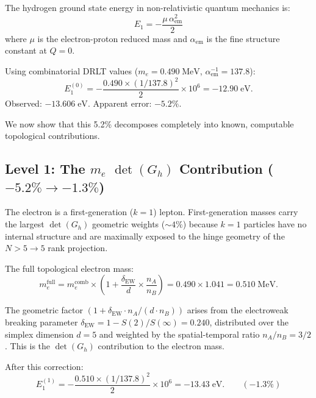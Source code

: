 \documentclass[12pt]{article}
\theoremstyle{remark}
\theoremstyle{definition}
\begin{document}
The hydrogen ground state energy in non-relativistic quantum mechanics is:
\begin{equation}
E_1 = -\frac{\mu\,\alpha_\text{em}^2}{2}
\end{equation}
where $\mu$ is the electron-proton reduced mass and $\alpha_\text{em}$ is the fine structure constant at $Q = 0$.

Using combinatorial DRLT values ($m_e = 0.490\;\text{MeV}$, $\alpha_\text{em}^{-1} = 137.8$):
\begin{equation}
E_1^{(0)} = -\frac{0.490 \times (1/137.8)^2}{2} \times 10^6 = -12.90\;\text{eV}.
\end{equation}
Observed: $-13.606\;\text{eV}$. Apparent error: $-5.2\%$.

We now show that this 5.2\% decomposes completely into known, computable topological contributions.

\subsection{Level 1: The $m_e$ $\det(G_h)$ Contribution ($-5.2\% \to -1.3\%$)}

The electron is a first-generation ($k = 1$) lepton. First-generation masses carry the largest $\det(G_h)$ geometric weights ($\sim 4\%$) because $k = 1$ particles have no internal structure and are maximally exposed to the hinge geometry of the $N > 5 \to 5$ rank projection.

The full topological electron mass:
\begin{equation}
m_e^\text{full} = m_e^\text{comb} \times \left(1 + \frac{\delta_\text{EW}}{d} \times \frac{n_A}{n_B}\right) = 0.490 \times 1.041 = 0.510\;\text{MeV}.
\end{equation}

The geometric factor $(1 + \delta_\text{EW} \cdot n_A/(d \cdot n_B))$ arises from the electroweak breaking parameter $\delta_\text{EW} = 1 - S(2)/S(\infty) = 0.240$, distributed over the simplex dimension $d = 5$ and weighted by the spatial-temporal ratio $n_A/n_B = 3/2$. This is the $\det(G_h)$ contribution to the electron mass.

After this correction:
\begin{equation}
E_1^{(1)} = -\frac{0.510 \times (1/137.8)^2}{2} \times 10^6 = -13.43\;\text{eV}. \qquad (-1.3\%)
\end{equation}
\end{document}
